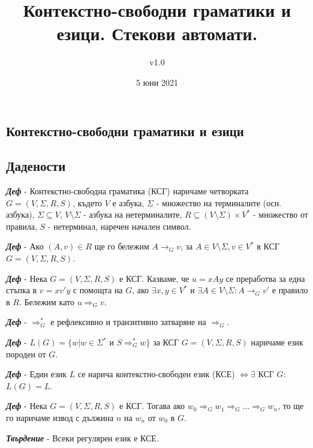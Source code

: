 \documentclass[fleqn,12pt]{article}
\title{Контекстно-свободни граматики и езици. Стекови автомати.}
\author{v1.0}
\date{5 юни 2021}
\begin{document}
\maketitle

\tableofcontents
\pagebreak
\begin{flushleft}

\section{Контекстно-свободни граматики и езици}
\subsection{Дадености}

\textit{\textbf{Деф}} - Контекстно-свободна граматика (КСГ) наричаме четворката $G = (V, \Sigma, R, S)$, където $V$ е азбука, $\Sigma$ - множество на терминалите (осн. азбука), $\Sigma \subseteq V$, $V \setminus \Sigma$ - азбука на нетерминалите, $R \subseteq (V \setminus \Sigma) \times V^*$ - множество от правила, $S$ - нетерминал, наречен начален символ.

\textit{\textbf{Деф}} - Ако $(A, v) \in R$ ще го бележим $A \to_G v$, за $A \in V \setminus \Sigma, v \in V^*$ в КСГ $G=(V, \Sigma, R, S)$.

\textit{\textbf{Деф}} - Нека $G = (V, \Sigma, R, S)$ е КСГ. Казваме, че $u = xAy$ се преработва за една стъпка в $v = xv'y$ с помощта на $G$, ако $\exists x, y \in V^*$ и $\exists A \in V \setminus \Sigma: A \to_G v'$ е правило в $R$. Бележим като $u \Rightarrow_G v$.

\textit{\textbf{Деф}} - $\Rightarrow_G^*$ е рефлексивно и транзитивно затваряне на $\Rightarrow_G$.

\textit{\textbf{Деф}} - $L(G) = \{w | w \in \Sigma^*$ и $ S \Rightarrow_G^* w\}$ за КСГ $G = (V, \Sigma, R, S)$ наричаме език породен от $G$.

\textit{\textbf{Деф}} - Един език $L$ се нарича контекстно-свободен език (КСЕ) $\iff \exists$ КСГ $G$: $L(G) = L$.

\textit{\textbf{Деф}} - Нека $G = (V, \Sigma, R, S)$ е КСГ. Тогава ако $w_0 \Rightarrow_G w_1 \Rightarrow_G \dots \Rightarrow_G w_n$, то ще го наричаме извод с дължина $n$ на $w_n$ от $w_0$ в $G$.

\textit{\textbf{Твърдение}} - Всеки регулярен език е КСЕ. 


\end{flushleft}
\end{document}
